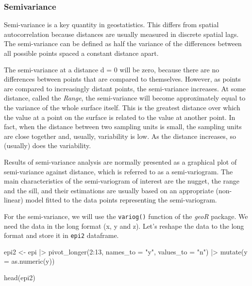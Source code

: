 \documentclass[
  letterpaper,
]{book}
\newenvironment{Shaded}{\begin{snugshade}}{\end{snugshade}}
\newcommand{\AttributeTok}[1]{\textcolor[rgb]{0.40,0.45,0.13}{#1}}
\newcommand{\DecValTok}[1]{\textcolor[rgb]{0.68,0.00,0.00}{#1}}
\newcommand{\FunctionTok}[1]{\textcolor[rgb]{0.28,0.35,0.67}{#1}}
\newcommand{\NormalTok}[1]{\textcolor[rgb]{0.00,0.23,0.31}{#1}}
\newcommand{\OtherTok}[1]{\textcolor[rgb]{0.00,0.23,0.31}{#1}}
\newcommand{\SpecialCharTok}[1]{\textcolor[rgb]{0.37,0.37,0.37}{#1}}
\newcommand{\StringTok}[1]{\textcolor[rgb]{0.13,0.47,0.30}{#1}}
\begin{document}
\hypertarget{semivariance}{%
\subsubsection{Semivariance}\label{semivariance}}

Semi-variance is a key quantity in geostatistics. This differs from
spatial autocorrelation because distances are usually measured in
discrete spatial lags. The semi-variance can be defined as half the
variance of the differences between all possible points spaced a
constant distance apart.

The semi-variance at a distance d = 0 will be zero, because there are no
differences between points that are compared to themselves. However, as
points are compared to increasingly distant points, the semi-variance
increases. At some distance, called the \emph{Range}, the semi-variance
will become approximately equal to the variance of the whole surface
itself. This is the greatest distance over which the value at a point on
the surface is related to the value at another point. In fact, when the
distance between two sampling units is small, the sampling units are
close together and, usually, variability is low. As the distance
increases, so (usually) does the variability.

Results of semi-variance analysis are normally presented as a graphical
plot of semi-variance against distance, which is referred to as a
semi-variogram. The main characteristics of the semi-variogram of
interest are the nugget, the range and the sill, and their estimations
are usually based on an appropriate (non-linear) model fitted to the
data points representing the semi-variogram.

For the semi-variance, we will use the \texttt{variog()} function of the
\emph{geoR} package. We need the data in the long format (x, y and z).
Let's reshape the data to the long format and store it in \texttt{epi2}
dataframe.

\begin{Shaded}
\begin{Highlighting}[]
\NormalTok{epi2 }\OtherTok{\textless{}{-}}\NormalTok{ epi }\SpecialCharTok{|\textgreater{}}
  \FunctionTok{pivot\_longer}\NormalTok{(}\DecValTok{2}\SpecialCharTok{:}\DecValTok{13}\NormalTok{,}
               \AttributeTok{names\_to =} \StringTok{"y"}\NormalTok{,}
               \AttributeTok{values\_to =} \StringTok{"n"}\NormalTok{) }\SpecialCharTok{|\textgreater{}}
  \FunctionTok{mutate}\NormalTok{(}\AttributeTok{y =} \FunctionTok{as.numeric}\NormalTok{(y))}

\FunctionTok{head}\NormalTok{(epi2)}
\end{Highlighting}
\end{Shaded}
\end{document}
